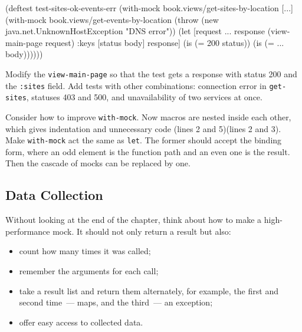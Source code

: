 \else

\begin{english}
  \begin{clojure/lines}
(deftest test-sites-ok-events-err
  (with-mock book.views/get-sites-by-location [...]
    (with-mock book.views/get-events-by-location
      (throw (new java.net.UnknownHostException "DNS error"))
      (let [request {...}
            response (view-main-page request)
            {:keys [status body]} response]
        (is (= 200 status))
        (is (= {...} body))))))
  \end{clojure/lines}
\end{english}

\fi

Modify the \verb|view-main-page| so that the test gets a response with status 200 and the \verb|:sites| field. Add tests with other combinations: connection error in \verb|get-sites|, statuses 403 and 500, and unavailability of two services at once.

Consider how to improve \verb|with-mock|. Now macros are nested inside each other, which gives indentation and unnecessary code \ifnarrow(lines 2 and 5)\else(lines 2 and 3)\fi. Make \verb|with-mock| act the same as \verb|let|. The former should accept the binding form, where an odd element is the function path and an even one is the result. Then the cascade of mocks can be replaced by one.

\subsection{Data Collection}


Without looking at the end of the chapter, think about how to make a high-performance mock. It should not only return a result but also:

\begin{itemize}

\item
  count how many times it was called;

\item
  remember the arguments for each call;

\item
  take a result list and return them alternately, for example, the first and second time~--- maps, and the third~--- an exception;

\item
  offer easy access to collected data.

\end{itemize}


